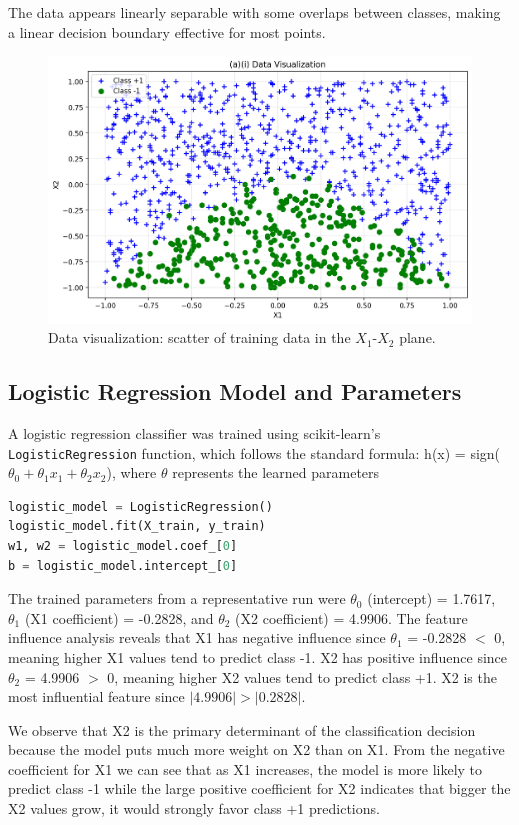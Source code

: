 \documentclass[12pt,a4paper]{article}
\begin{document}
The data appears linearly separable with some overlaps between classes, making a linear decision boundary effective for most points.

\begin{figure}[H]
    \centering
    \includegraphics[width=0.7\linewidth]{data_scatter.png}
    \caption{Data visualization: scatter of training data in the \(X_1\)-\(X_2\) plane.}
    \label{fig:data_scatter}
\end{figure}

\subsection{Logistic Regression Model and Parameters}

A logistic regression classifier was trained using scikit-learn's \texttt{LogisticRegression} function, which follows the standard formula:
h(x) = sign($\theta_0 + \theta_1 x_1 + \theta_2 x_2$), where $\theta$ represents the learned parameters

\begin{lstlisting}[language=Python, caption={Model training and parameters extraction}]
logistic_model = LogisticRegression()
logistic_model.fit(X_train, y_train)
w1, w2 = logistic_model.coef_[0]
b = logistic_model.intercept_[0]
\end{lstlisting}

The trained parameters from a representative run were $\theta_0$ (intercept) = 1.7617, $\theta_1$ (X1 coefficient) = -0.2828, and $\theta_2$ (X2 coefficient) = 4.9906. The feature influence analysis reveals that X1 has negative influence since $\theta_1$ = -0.2828 $<$ 0, meaning higher X1 values tend to predict class -1. X2 has positive influence since $\theta_2$ = 4.9906 $>$ 0, meaning higher X2 values tend to predict class +1. X2 is the most influential feature since $|4.9906| > |0.2828|$.

We observe that X2 is the primary determinant of the classification decision because the model puts much more weight on X2 than on X1. From the negative coefficient for X1 we can see that as X1 increases, the model is more likely to predict class -1 while the large positive coefficient for X2 indicates that bigger the X2 values grow, it would strongly favor class +1 predictions.
\end{document}

